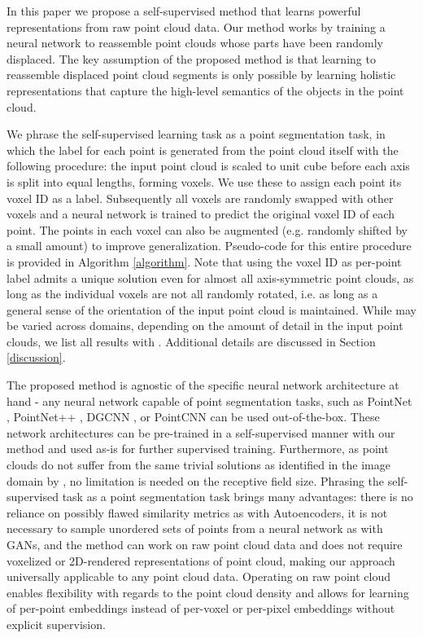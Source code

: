 \documentclass{article}
\begin{document}
In this paper we propose a self-supervised method that learns powerful representations from raw point cloud data. Our method works by training a neural network to reassemble point clouds whose parts have been randomly displaced. The key assumption of the proposed method is that learning to reassemble displaced point cloud segments is only possible by learning holistic representations that capture the high-level semantics of the objects in the point cloud.

We phrase the self-supervised learning task as a point segmentation task, in which the label for each point is generated from the point cloud itself with the following procedure: the input point cloud is scaled to unit cube before each axis is split into  equal lengths, forming  voxels. We use these to assign each point its voxel ID as a label. Subsequently all voxels are randomly swapped with other voxels and a neural network is trained to predict the original voxel ID of each point. The points in each voxel can also be augmented (e.g. randomly shifted by a small amount) to improve generalization. Pseudo-code for this entire procedure is provided in Algorithm \ref{algorithm}. Note that using the voxel ID as per-point label admits a unique solution even for almost all axis-symmetric point clouds, as long as the individual voxels are not all randomly rotated, i.e. as long as a general sense of the orientation of the input point cloud is maintained. While  may be varied across domains, depending on the amount of detail in the input point clouds, we list all results with . Additional details are discussed in Section \ref{discussion}. 

The proposed method is agnostic of the specific neural network architecture at hand - any neural network capable of point segmentation tasks, such as PointNet \cite{pointnet}, PointNet++ \cite{pointnet++}, DGCNN \cite{dgcnn}, or PointCNN \cite{pointcnn} can be used out-of-the-box. These network architectures can be pre-trained in a self-supervised manner with our method and used as-is for further supervised training. Furthermore, as point clouds do not suffer from the same trivial solutions as identified in the image domain by \cite{contextprediction, jigsaw}, no limitation is needed on the receptive field size. Phrasing the self-supervised task as a point segmentation task brings many advantages: there is no reliance on possibly flawed similarity metrics as with Autoencoders, it is not necessary to sample unordered sets of points from a neural network as with GANs, and the method can work on raw point cloud data and does not require voxelized or 2D-rendered representations of point cloud, making our approach universally applicable to any point cloud data. Operating on raw point cloud enables flexibility with regards to the point cloud density and allows for learning of per-point embeddings instead of per-voxel or per-pixel embeddings without explicit supervision. 
\end{document}
